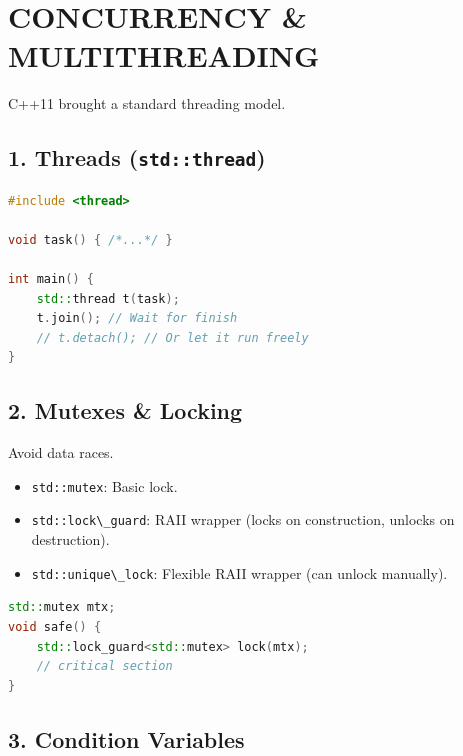 \hypertarget{concurrency-multithreading}{%
\chapter{CONCURRENCY \&
MULTITHREADING}\label{concurrency-multithreading}}

C++11 brought a standard threading model.

\hypertarget{threads-stdthread}{%
\section{\texorpdfstring{1. Threads
(\texttt{std::thread})}{1. Threads (std::thread)}}\label{threads-stdthread}}

\begin{lstlisting}[language={C++}]
#include <thread>

void task() { /*...*/ }

int main() {
    std::thread t(task);
    t.join(); // Wait for finish
    // t.detach(); // Or let it run freely
}
\end{lstlisting}

\hypertarget{mutexes-locking}{%
\section{2. Mutexes \& Locking}\label{mutexes-locking}}

Avoid data races.

\begin{itemize}
\tightlist
\item
  \passthrough{\lstinline!std::mutex!}: Basic lock.
\item
  \passthrough{\lstinline!std::lock\_guard!}: RAII wrapper (locks on
  construction, unlocks on destruction).
\item
  \passthrough{\lstinline!std::unique\_lock!}: Flexible RAII wrapper
  (can unlock manually).
\end{itemize}

\begin{lstlisting}[language={C++}]
std::mutex mtx;
void safe() {
    std::lock_guard<std::mutex> lock(mtx);
    // critical section
}
\end{lstlisting}

\hypertarget{condition-variables}{%
\section{3. Condition Variables}\label{condition-variables}}

